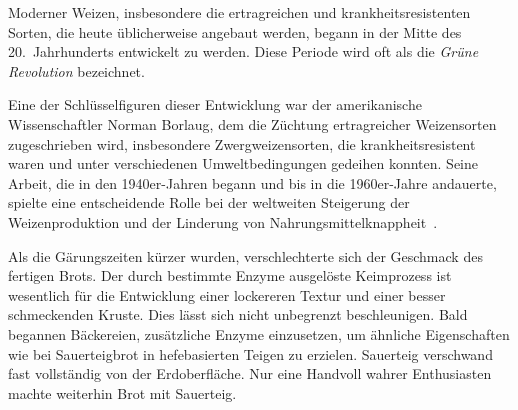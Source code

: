 Moderner Weizen, insbesondere die ertragreichen und krankheitsresistenten Sorten,
die heute üblicherweise angebaut werden, begann in der Mitte des 20.~Jahrhunderts
entwickelt zu werden. Diese Periode wird oft als die \emph{Grüne Revolution} bezeichnet.

Eine der Schlüsselfiguren dieser Entwicklung war der amerikanische Wissenschaftler Norman
Borlaug, dem die Züchtung ertragreicher Weizensorten zugeschrieben wird,
insbesondere Zwergweizensorten, die krankheitsresistent waren und unter
verschiedenen Umweltbedingungen gedeihen konnten. Seine Arbeit, die in den
1940er-Jahren begann und bis in die \num{1960}er-Jahre andauerte, spielte eine entscheidende Rolle
bei der weltweiten Steigerung der Weizenproduktion und der Linderung von
Nahrungsmittelknappheit~\cite{green+revolution}.

Als die Gärungszeiten kürzer wurden, verschlechterte sich der Geschmack des fertigen Brots.
Der durch bestimmte Enzyme ausgelöste Keimprozess ist wesentlich
für die Entwicklung einer lockereren Textur und einer besser schmeckenden Kruste. Dies
lässt sich nicht unbegrenzt beschleunigen. Bald begannen Bäckereien,
zusätzliche Enzyme einzusetzen, um ähnliche Eigenschaften
wie bei Sauerteigbrot in hefebasierten Teigen zu erzielen. Sauerteig verschwand fast vollständig
von der Erdoberfläche. Nur eine Handvoll
wahrer Enthusiasten machte weiterhin Brot mit Sauerteig.

